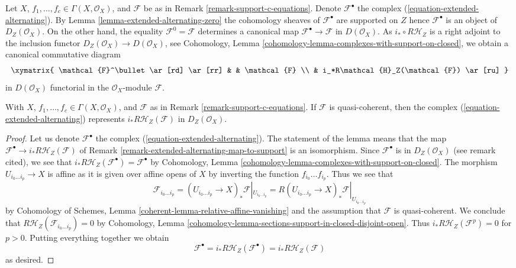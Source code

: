 \begin{remark}
\label{remark-extended-alternating-map-to-support}
Let $X$, $f_1, \ldots, f_c \in \Gamma(X, \mathcal{O}_X)$, and
$\mathcal{F}$ be as in Remark \ref{remark-support-c-equations}.
Denote $\mathcal{F}^\bullet$ the complex
(\ref{equation-extended-alternating}). By
Lemma \ref{lemma-extended-alternating-zero}
the cohomology sheaves of $\mathcal{F}^\bullet$
are supported on $Z$ hence $\mathcal{F}^\bullet$ is an object of
$D_Z(\mathcal{O}_X)$. On the other hand, the equality
$\mathcal{F}^0 = \mathcal{F}$ determines a canonical map
$\mathcal{F}^\bullet \to \mathcal{F}$ in $D(\mathcal{O}_X)$.
As $i_* \circ R\mathcal{H}_Z$ is a right adjoint to the
inclusion functor $D_Z(\mathcal{O}_X) \to D(\mathcal{O}_X)$, see
Cohomology, Lemma \ref{cohomology-lemma-complexes-with-support-on-closed},
we obtain a canonical commutative diagram
$$
\xymatrix{
\mathcal{F}^\bullet \ar[rd] \ar[rr] & & \mathcal{F} \\
& i_*R\mathcal{H}_Z(\mathcal{F}) \ar[ru]
}
$$
in $D(\mathcal{O}_X)$ functorial in the $\mathcal{O}_X$-module $\mathcal{F}$.
\end{remark}

\begin{lemma}
\label{lemma-extended-alternating-represented}
With $X$, $f_1, \ldots, f_c \in \Gamma(X, \mathcal{O}_X)$, and
$\mathcal{F}$ as in Remark \ref{remark-support-c-equations}.
If $\mathcal{F}$ is quasi-coherent, then the complex
(\ref{equation-extended-alternating}) represents
$i_* R\mathcal{H}_Z(\mathcal{F})$ in $D_Z(\mathcal{O}_X)$.
\end{lemma}

\begin{proof}
Let us denote $\mathcal{F}^\bullet$ the complex
(\ref{equation-extended-alternating}).
The statement of the lemma means that the map
$\mathcal{F}^\bullet \to i_*R\mathcal{H}_Z(\mathcal{F})$
of Remark \ref{remark-extended-alternating-map-to-support}
is an isomorphism. Since $\mathcal{F}^\bullet$ is in
$D_Z(\mathcal{O}_X)$ (see remark cited), we see that
$i_*R\mathcal{H}_Z(\mathcal{F}^\bullet) = \mathcal{F}^\bullet$
by Cohomology, Lemma \ref{cohomology-lemma-complexes-with-support-on-closed}.
The morphism $U_{i_0 \ldots i_p} \to X$ is affine
as it is given over affine opens of $X$ by inverting the function
$f_{i_0} \ldots f_{i_p}$. Thus we see that
$$
\mathcal{F}_{i_0 \ldots i_p} =
(U_{i_0 \ldots i_p} \to X)_*\mathcal{F}|_{U_{i_0 \ldots i_p}} =
R(U_{i_0 \ldots i_p} \to X)_*\mathcal{F}|_{U_{i_0 \ldots i_p}}
$$
by Cohomology of Schemes, Lemma \ref{coherent-lemma-relative-affine-vanishing}
and the assumption that $\mathcal{F}$ is quasi-coherent. We conclude that
$R\mathcal{H}_Z(\mathcal{F}_{i_0 \ldots i_p}) = 0$ by Cohomology, Lemma
\ref{cohomology-lemma-sections-support-in-closed-disjoint-open}.
Thus $i_*R\mathcal{H}_Z(\mathcal{F}^p) = 0$ for $p > 0$.
Putting everything together we obtain
$$
\mathcal{F}^\bullet = i_*R\mathcal{H}_Z(\mathcal{F}^\bullet) =
i_*R\mathcal{H}_Z(\mathcal{F})
$$
as desired.
\end{proof}

